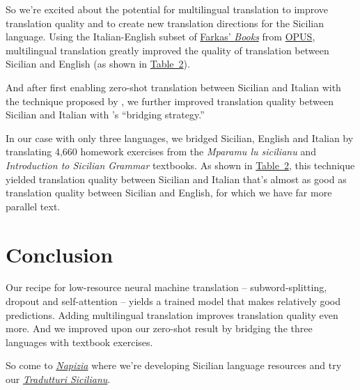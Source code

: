\documentclass[10pt,letterpaper]{article}
\begin{document}
So we're excited about the potential for multilingual translation to improve translation quality and
to create new translation directions for the Sicilian language.
Using the Italian-English subset of
\href{https://farkastranslations.com/bilingual_books.php}{Farkas' \textit{Books}} %
from \href{https://opus.nlpl.eu/}{OPUS}, 
multilingual translation greatly improved the
quality of translation between Sicilian and English
(as shown in \hyperlink{bleuscores}{Table~2}).


And after first enabling zero-shot translation between Sicilian and Italian with the technique proposed by
\citeauthor{johnson2017zeroshot}, we further improved translation quality between Sicilian and Italian with
\citeauthor{fan2020beyond}'s ``bridging strategy.''

In our case with only three languages, we bridged
Sicilian, English and Italian by translating 4,660 homework exercises from
the \textit{Mparamu lu sicilianu} \citep{cipolla2013} and 
\textit{Introduction to Sicilian Grammar} \citep{bonner2001} textbooks.
As shown in \hyperlink{bleuscores}{Table~2},
this technique yielded translation quality between Sicilian and Italian
that's almost as good as translation quality between Sicilian and English,
for which we have far more parallel text.



\hypertarget{conclusion}{}

\section{Conclusion}

Our recipe for low-resource neural machine translation -- subword-splitting,
dropout and self-attention -- yields a trained model that makes relatively good predictions.
Adding multilingual translation improves translation quality even more.
And we improved upon our zero-shot result by bridging the three languages with textbook exercises.

So come to \textit{\href{https://www.napizia.com/}{Napizia}}
where we're developing Sicilian language resources
and try our \textit{\href{https://translate.napizia.com/}{Tradutturi Sicilianu}}.
\end{document}
